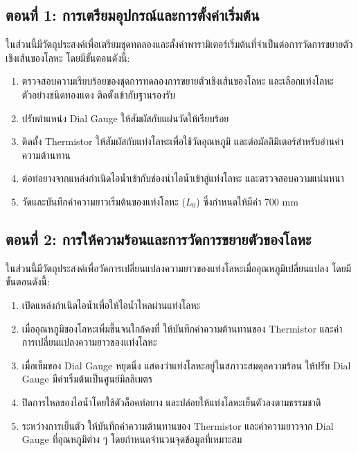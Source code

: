 \documentclass[11pt,a4paper]{article}
\begin{document}
\subsection*{ตอนที่ 1: การเตรียมอุปกรณ์และการตั้งค่าเริ่มต้น}
ในส่วนนี้มีวัตถุประสงค์เพื่อเตรียมชุดทดลองและตั้งค่าพารามิเตอร์เริ่มต้นที่จำเป็นต่อการวัดการขยายตัวเชิงเส้นของโลหะ โดยมีขั้นตอนดังนี้:
\begin{enumerate}
    \item ตรวจสอบความเรียบร้อยของชุดการทดลองการขยายตัวเชิงเส้นของโลหะ และเลือกแท่งโลหะตัวอย่างชนิดทองแดง ติดตั้งเข้ากับฐานรองรับ
    \item ปรับตำแหน่ง Dial Gauge ให้สัมผัสกับแผ่นวัดให้เรียบร้อย
    \item ติดตั้ง Thermistor ให้สัมผัสกับแท่งโลหะเพื่อใช้วัดอุณหภูมิ และต่อมัลติมิเตอร์สำหรับอ่านค่าความต้านทาน
    \item ต่อท่อยางจากแหล่งกำเนิดไอน้ำเข้ากับช่องนำไอน้ำเข้าสู่แท่งโลหะ และตรวจสอบความแน่นหนา
    \item วัดและบันทึกค่าความยาวเริ่มต้นของแท่งโลหะ ($L_0$) ซึ่งกำหนดให้มีค่า 700 mm
\end{enumerate}

\subsection*{ตอนที่ 2: การให้ความร้อนและการวัดการขยายตัวของโลหะ}
ในส่วนนี้มีวัตถุประสงค์เพื่อวัดการเปลี่ยนแปลงความยาวของแท่งโลหะเมื่ออุณหภูมิเปลี่ยนแปลง โดยมีขั้นตอนดังนี้:
\begin{enumerate}
    \item เปิดแหล่งกำเนิดไอน้ำเพื่อให้ไอน้ำไหลผ่านแท่งโลหะ
    \item เมื่ออุณหภูมิของโลหะเพิ่มขึ้นจนใกล้คงที่ ให้บันทึกค่าความต้านทานของ Thermistor และค่าการเปลี่ยนแปลงความยาวของแท่งโลหะ
    \item เมื่อเข็มของ Dial Gauge หยุดนิ่ง แสดงว่าแท่งโลหะอยู่ในสภาวะสมดุลความร้อน ให้ปรับ Dial Gauge มีค่าเริ่มต้นเป็นศูนย์มิลลิเมตร
    \item ปิดการไหลของไอน้ำโดยใช้ตัวล็อคท่อยาง และปล่อยให้แท่งโลหะเย็นตัวลงตามธรรมชาติ
    \item ระหว่างการเย็นตัว ให้บันทึกค่าความต้านทานของ Thermistor และค่าความยาวจาก Dial Gauge ที่อุณหภูมิต่าง ๆ โดยกำหนดจำนวนจุดข้อมูลที่เหมาะสม
\end{enumerate}
\end{document}
